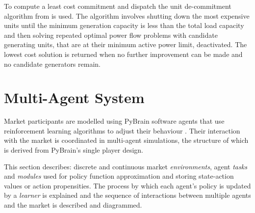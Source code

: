 To compute a least cost commitment and dispatch the unit de-commitment
algorithm from  is used.  The algorithm
involves shutting down the most expensive units until the
minimum generation capacity is less than the total load capacity and then
solving repeated optimal power flow problems with candidate generating units,
that are at their minimum active power limit, deactivated.  The lowest cost
solution is returned when no further improvement can be made and no candidate
generators remain.

%
%

\section{Multi-Agent System}
\label{sec:mas}
Market participants are modelled using PyBrain software agents that use
reinforcement learning algorithms to adjust their behaviour \cite{schaul:2010}.
Their interaction with the market is coordinated in multi-agent simulations, the
structure of which is derived from PyBrain's single player design.

This section describes: discrete and continuous market \textit{environments},
agent \textit{tasks} and \textit{modules} used for policy function
approximation and storing state-action values or action propensities.  The
process by which each agent's policy is updated by a \textit{learner} is
explained and the sequence of interactions between multiple agents and the
market is described and diagrammed.

